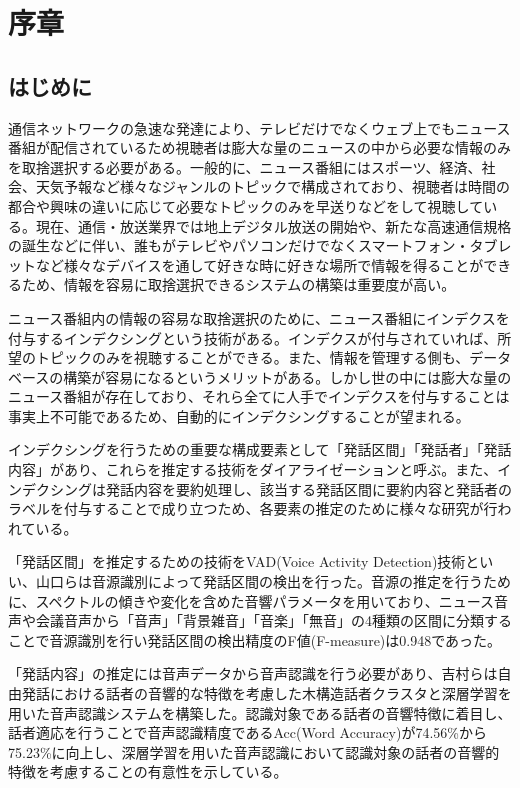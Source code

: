 \chapter{序章}
\section{はじめに}
通信ネットワークの急速な発達により、テレビだけでなくウェブ上でもニュース番組が配信されているため視聴者は膨大な量のニュースの中から必要な情報のみを取捨選択する必要がある。一般的に、ニュース番組にはスポーツ、経済、社会、天気予報など様々なジャンルのトピックで構成されており、視聴者は時間の都合や興味の違いに応じて必要なトピックのみを早送りなどをして視聴している。現在、通信・放送業界では地上デジタル放送の開始や、新たな高速通信規格の誕生などに伴い、誰もがテレビやパソコンだけでなくスマートフォン・タブレットなど様々なデバイスを通して好きな時に好きな場所で情報を得ることができるため、情報を容易に取捨選択できるシステムの構築は重要度が高い。\par

ニュース番組内の情報の容易な取捨選択のために、ニュース番組にインデクスを付与するインデクシングという技術がある。インデクスが付与されていれば、所望のトピックのみを視聴することができる。また、情報を管理する側も、データベースの構築が容易になるというメリットがある。しかし世の中には膨大な量のニュース番組が存在しており、それら全てに人手でインデクスを付与することは事実上不可能であるため、自動的にインデクシングすることが望まれる。\par

インデクシングを行うための重要な構成要素として「発話区間」「発話者」「発話内容」があり、これらを推定する技術をダイアライゼーションと呼ぶ。また、インデクシングは発話内容を要約処理し、該当する発話区間に要約内容と発話者のラベルを付与することで成り立つため、各要素の推定のために様々な研究が行われている。\par

「発話区間」を推定するための技術をVAD(Voice Activity Detection)技術といい、山口ら\cite{yamaguchi_indexing}は音源識別によって発話区間の検出を行った。音源の推定を行うために、スペクトルの傾きや変化を含めた音響パラメータを用いており、ニュース音声や会議音声から「音声」「背景雑音」「音楽」「無音」の4種類の区間に分類することで音源識別を行い発話区間の検出精度のF値(F-measure)は0.948であった。\par

「発話内容」の推定には音声データから音声認識を行う必要があり、吉村ら\cite{yoshimura_clustering}は自由発話における話者の音響的な特徴を考慮した木構造話者クラスタと深層学習を用いた音声認識システムを構築した。認識対象である話者の音響特徴に着目し、話者適応を行うことで音声認識精度であるAcc(Word Accuracy)が74.56\%から75.23\%に向上し、深層学習を用いた音声認識において認識対象の話者の音響的特徴を考慮することの有意性を示している。\par

